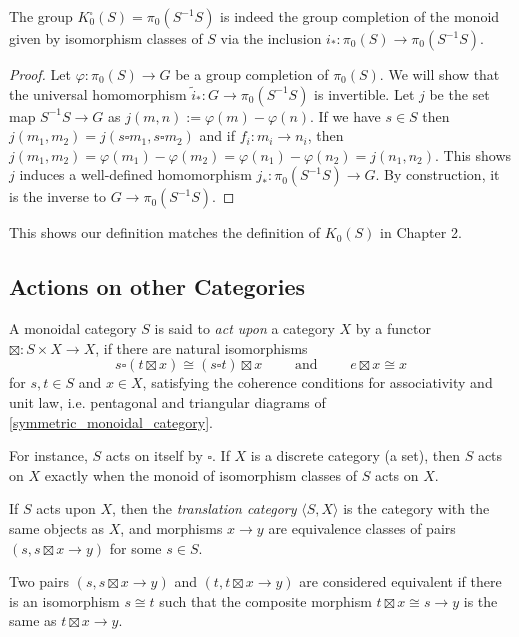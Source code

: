 \begin{proposition}
The group $K_0^\square(S) = \pi_0(S^{-1}S)$ is indeed the group completion of the monoid given by
isomorphism classes of $S$ via the inclusion $i_*: \pi_0(S) \to \pi_0(S^{-1}S)$.
\end{proposition}
\begin{proof}
Let $\varphi : \pi_0(S) \to G$ be a group completion of $\pi_0(S)$.
We will show that the universal homomorphism $\widetilde i_* : G \to \pi_0(S^{-1}S)$ is invertible.
Let $j$ be the set map $S^{-1}S \to  G$ as $j(m,n) := \varphi(m) - \varphi(n)$.
If we have $s \in S$ then
$j(m_1,m_2) = j(s\square m_1, s\square m_2)$ and if $f_i : m_i \to n_i$, then $j(m_1,m_2) = \varphi(m_1) - \varphi(m_2) = \varphi(n_1) - \varphi(n_2) = j(n_1,n_2)$.
This shows $j$ induces a well-defined homomorphism $j_* : \pi_0(S^{-1}S) \to G$.
By construction, it is the inverse to $G \to \pi_0(S^{-1}S)$.
\end{proof}
This shows our definition matches the definition of $K_0(S)$ in Chapter 2.

\subsection{Actions on other Categories}
\begin{definition}
A monoidal category $S$ is said to \emph{act upon} a category $X$ by a functor $\boxtimes : S \times X \to X$,
if there are natural isomorphisms
  \[s \square  (t\boxtimes  x) \cong (s\square t) \boxtimes  x \qquad \text{ and } \qquad e\boxtimes  x \cong x\]
for $s,t \in S$ and $x \in X$,
satisfying the coherence conditions for associativity and unit law, i.e. pentagonal and triangular diagrams of \ref{symmetric_monoidal_category}.
\end{definition}

For instance, $S$ acts on itself by $\square$. If $X$ is a discrete category (a set), then $S$ acts on $X$ exactly when the monoid of isomorphism classes of $S$
acts on $X$.

\begin{definition}
If $S$ acts upon $X$, then the \emph{translation category} $\langle S, X \rangle$ is the category with the same objects as $X$, and morphisms $x \to y$
are equivalence classes of pairs $(s, s \boxtimes x \to y)$ for some $s \in S$.

Two pairs $(s,s \boxtimes x \to y)$
and $(t, t \boxtimes x \to y)$ are considered equivalent if there is an isomorphism $s \cong t$ such that the
composite morphism $t \boxtimes x \cong s \to y$ is the same as $t \boxtimes x \to y$.
\end{definition}

